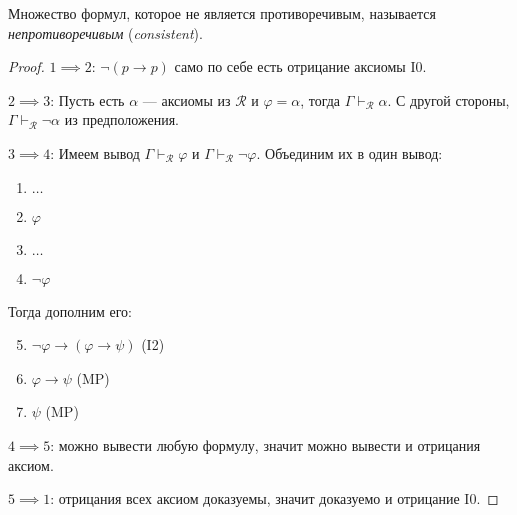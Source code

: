 \documentclass[12pt]{article}
\let\im\rightarrow
\let\n\neg
\theoremstyle{definition}
\theoremstyle{plain}
\theoremstyle{remark}
\begin{document}
Множество формул, которое не является противоречивым, называется
\textit{непротиворечивым} (\textit{consistent}).

\begin{proof}
  $1 \implies 2$: $\n (p \im p)$ само по себе есть отрицание аксиомы I0.

  $2 \implies 3$:
  Пусть есть $\alpha$ --- аксиомы из $\mathcal{R}$ и $\varphi =
  \alpha$, тогда $\Gamma \vdash_{\mathcal{R}} \alpha$. С другой
  стороны, $\Gamma \vdash_{\mathcal{R}} \n \alpha$ из предположения.

  $3 \implies 4$:
  Имеем вывод $\Gamma \vdash_{\mathcal{R}} \varphi$ и $\Gamma
  \vdash_{\mathcal{R}} \n \varphi$. Объединим их в один вывод:
  \begin{enumerate}
    \item $\dots$

    \item $\varphi$

    \item $\dots$

    \item $\n \varphi$
  \end{enumerate}

  Тогда дополним его:
  \begin{enumerate}
      \setcounter{enumi}{4}

    \item $\n \varphi \im (\varphi \im \psi)$ (I2)

    \item $\varphi \im \psi$ (MP)

    \item $\psi$ (MP)
  \end{enumerate}

  $4 \implies 5$: можно вывести любую формулу, значит можно вывести и
  отрицания аксиом.

  $5 \implies 1$: отрицания всех аксиом доказуемы, значит доказуемо и
  отрицание I0.
\end{proof}
\end{document}
